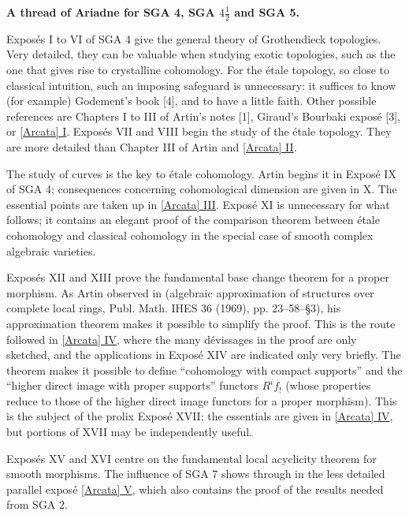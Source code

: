 \markboth{}{}
\thispagestyle{plain}
{}
\begin{center}
\textbf{A thread of Ariadne for SGA 4, SGA $4\frac12$ and SGA 5.}
\end{center}
\label{Ariane}

Exposés I to VI of SGA 4 give the general theory of Grothendieck topologies.
Very detailed, they can be valuable when studying exotic topologies, such as
the one that gives rise to crystalline cohomology. For the étale topology,
so close to classical intuition, such an imposing safeguard is unnecessary:
it suffices to know (for example) Godement's book [4], and to have a little
faith. Other possible references are Chapters I to III of Artin's notes [1],
Giraud's Bourbaki exposé [3], or \hyperref[I:1]{[Arcata] I}. Exposés VII and
VIII begin the study of the étale topology. They are more detailed than
Chapter III of Artin and \hyperref[I:2]{[Arcata] II}.

The study of curves is the key to étale cohomology. Artin begins it in
Exposé IX of SGA 4; consequences concerning cohomological dimension are
given in X. The essential points are taken up in \hyperref[I:3]{[Arcata] III}.
Exposé XI is unnecessary for what follows; it contains an elegant proof of
the comparison theorem between étale cohomology and classical cohomology
in the special case of smooth complex algebraic varieties.

Exposés XII and XIII prove the fundamental base change theorem for a proper
morphism. As Artin observed in (algebraic approximation of structures over
complete local rings, Publ. Math. IHES 36 (1969), pp. 23--58--§3), his
approximation theorem makes it possible to simplify the proof. This is the
route followed in \hyperref[I:4]{[Arcata] IV}, where the many dévissages in
the proof are only sketched, and the applications in Exposé XIV are indicated
only very briefly. The theorem makes it possible to define ``cohomology with
compact supports'' and the ``higher direct image with proper supports''
functors $R^i f_!$ (whose properties reduce to those of the higher direct image
functors for a proper morphism). This is the subject of the prolix Exposé XVII;
the essentials are given in \hyperref[I:4]{[Arcata] IV}, but portions of XVII
may be independently useful.

Exposés XV and XVI centre on the fundamental local acyclicity theorem for
smooth morphisms. The influence of SGA 7 shows through in the less detailed
parallel exposé \hyperref[I:5]{[Arcata] V}, which also contains the proof of
the results needed from SGA 2.

